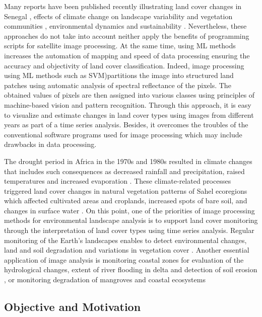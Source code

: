 \documentclass[earth,article,submit,pdftex,moreauthors]{Definitions/mdpi}
\begin{document}
{Many reports have been published recently illustrating} land cover changes in Senegal \cite{WOOD2004565,ELBERLING200337,Hiraldo}, effects of climate change on landscape variability and vegetation communities \cite{LIU2004583,TSCHAKERT2004535,LUFAFA20081}, environmental dynamics and sustainability \cite{CAMARA2017204}. {Nevertheless, these} approaches do not {take into account} {neither} apply the {benefits} of {programming scripts for} satellite image processing{. At the same time}, using ML methods increases the automation of mapping {and speed of data processing }ensuring the accuracy and objectivity of land cover classification. Indeed, image processing using {ML methods such as {SVM)}}partitions the image into structured land patches using automatic analysis of spectral reflectance of the pixels{. {The} obtained {values of pixels are then }assigned }into various classes using principles of machine{-}based vision and pattern recognition. {Through this} approach, it {is easy} to {visualize} and estimate changes in land cover types using images {from} different years as {part of a} time series analysis. Besides, it overcomes the {troubles} of the {conventional software programs} used for image processing which {may include} drawbacks {in} data processing.

The drought period in Africa in the 1970s and 1980s resulted in climate changes{ that includes }such consequences as decreased rainfall and precipitation, raised temperatures and increased evaporation \cite{Paturel,Lemenkova202217}. {These climate-related} processes triggered land cover changes in natural vegetation patterns of Sahel ecoregions which affected cultivated areas and croplands, increased spots of bare soil, and changes in surface water \cite{Fritz,Lemenkova202313}. {On this point}, one of the priorities of image processing methods {for environmental landscape analysis }is to support {land cover} monitoring through {the} interpretation of land cover types using time series analysis{. Regular {monitoring of the Earth's }landscapes }enables to detect environmental changes, land and soil degradation and variations in vegetation cover \cite{MBOW2008210}. Another essential application of image analysis is monitoring coastal zones for {evaluation of} the hydrological changes, extent of river flooding in delta and detection {of soil }erosion \cite{NDOUR201892,NGOM201634}, or monitoring degradation of mangroves and coastal ecosystems \cite{LOMBARD2023102027,CARNEY2014126}

\subsection{Objective and Motivation}
\end{document}
